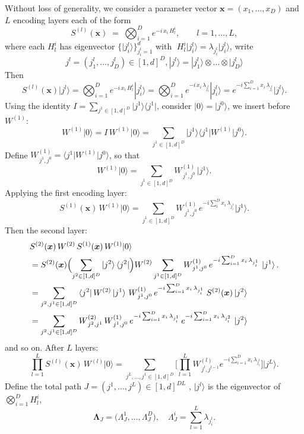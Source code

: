 \documentclass[%
 reprint,
 amsmath,amssymb,
 aps,
 pra,
]{revtex4-2}
\theoremstyle{definition}
\begin{document}
Without loss of generality, we consider a parameter vector \(\bm{x}=(x_1,\dots,x_D)\) and \(L\) encoding layers each of the form
\[
S^{(l)}(\bm{x})
\;=\;
\bigotimes_{i=1}^D e^{-i\,x_i\,H_l^i},
\qquad l=1,\dots,L,
\]
where each \(H_l^i\) has eigenvector \(\{\lvert j_i^l\rangle\}_{j_i^l=1}^d\) with \(\;H_l^i\lvert j_i^l\rangle=\lambda_{j_i^l}\lvert j_i^l\rangle\), write
\[
j^l=(j^l_1,\dots,j^l_D)\in[1,d]^D,|j^l\rangle=|j^l_1\rangle \otimes\dots  \otimes|j^l_D\rangle
\]
Then
\[
S^{(l)}(\bm{x})\lvert j^l\rangle=\bigotimes_{i=1}^D e^{-i\,x_i\,H_l^i}|j^l_i\rangle
=\bigotimes_{i=1}^D e^{-i\,x_i\,\lambda_{j_i^l}}|j^l_i\rangle
=e^{-i\sum_{i=1}^D x_i\,\lambda_{j_i^l}}\lvert j^l\rangle.
\]
Using the identity $I=\sum_{j^1\in[1,d]^D}\lvert j^1\rangle\langle j^1\rvert$, consider $\lvert0\rangle=\lvert j^0\rangle$, we insert before \(W^{(1)}\):
\[
W^{(1)}\lvert0\rangle
=I\,W^{(1)}\lvert0\rangle
=\sum_{j^1\in[1,d]^D}\lvert j^1\rangle\langle j^1\rvert W^{(1)}\lvert j^0\rangle.
\]
Define $W^{(1)}_{\,j^1,j^0}
=\langle j^1\rvert W^{(1)}\lvert j^0\rangle$, so that
\[
W^{(1)}\lvert0\rangle
=\sum_{j^1\in[1,d]^D}W^{(1)}_{\,j^1,j^0}\,\lvert j^1\rangle.
\]
Applying the first encoding layer:
\[
S^{(1)}(\bm{x})\,W^{(1)}\lvert0\rangle
=\sum_{j^1\in[1,d]^D}W^{(1)}_{\,j^1,j^0}
\,e^{-i\sum_{i}^Dx_i\,\lambda_{j^1_i}}
\lvert j^1\rangle.
\]
Then the second layer:
\[
\begin{aligned}
&S^{(2)}(\bm{x})\,W^{(2)}\,S^{(1)}(\bm{x})\,W^{(1)}\lvert0\rangle\\
&= S^{(2)}(\bm{x})
  \Bigl(\sum_{j^2\in[1,d]^D}\ket{j^2}\bra{j^2}\Bigr) W^{(2)}
  \sum_{j^1\in[1,d]^D}
  W^{(1)}_{\,j^1,j^0}\,
  e^{-i\sum_{i=1}^D x_i\,\lambda_{j^1_i}}
  \,\ket{j^1}.\\
&=\sum_{j^2,j^1\in[1,d]^D}
\bra{j^2}W^{(2)}\ket{j^1}\,
  W^{(1)}_{\,j^1,j^0}\,
  e^{-i\sum_{i=1}^D x_i\,\lambda_{j^1_i}}
  \;S^{(2)}(\bm{x})\ket{j^2}\\
&=\sum_{j^2,j^1\in[1,d]^D}
  W^{(2)}_{\,j^2,j^1}\,
  W^{(1)}_{\,j^1,j^0}\,
  e^{-i\sum_{i=1}^D x_i\,\lambda_{j^1_i}}\,
  e^{-i\sum_{i=1}^D x_i\,\lambda_{j^2_i}}\,
  \ket{j^2}
\end{aligned}
\]
and so on. After \(L\) layers:
\[
\prod_{l=1}^L S^{(l)}(\bm{x})\,W^{(l)}\lvert0\rangle
=\sum_{j^L,\dots,j^1\in[1,d]^D}
\biggl[\prod_{l=1}^L W^{(l)}_{\,j^l,j^{l-1}}
e^{-i\sum_{i=1}^D x_i\,\lambda_{j_i^l}}\biggr]
\lvert j^L\rangle.
\]
Define the total path \(J=(j^1,\dots,j^L)\in[1,d]^{DL}\) , $|j^l\rangle$ is the eigenvector of  $\bigotimes_{i=1}^D H_l^i$,
\[
\boldsymbol\Lambda_J
=\bigl(\Lambda_J^1,\dots,\Lambda_J^D\bigr),
\quad
\Lambda_J^i=\sum_{l=1}^L\lambda_{j_i^l}.
\]
\end{document}
